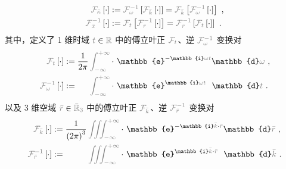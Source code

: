 \begin{subequations} \label{eq:FT-xkappa}
\begin{align}
	\mathcolor{gray}{\mathcal F_{\bar{\kappa}}} \left[ \cdot \right] &:= \mathcolor{gray}{\mathcal F_{\omega}^{-1}} \left[ \mathcolor{gray}{\mathcal F_{\bar{k}}} \left[ \cdot \right] \right] = \mathcolor{gray}{\mathcal F_{\bar{k}}} \left[ \mathcolor{gray}{\mathcal F_{\omega}^{-1}} \left[ \cdot \right] \right] ~, \label{eq:FT-kappa} \\
	\mathcolor{gray}{\mathcal F_{\bar{x}}^{-1}} \left[ \cdot \right] &:= \mathcolor{gray}{\mathcal F_{t}} \left[ \mathcolor{gray}{\mathcal F_{\bar{r}}^{-1}} \left[ \cdot \right] \right] = \mathcolor{gray}{\mathcal F_{\bar{r}}^{-1}} \left[ \mathcolor{gray}{\mathcal F_{t}} \left[ \cdot \right] \right] ~. \label{eq:IFT-x}
\end{align}
\end{subequations}
其中，定义了 1 维时域 $\mathcolor{gray}{t} \in \mathcolor{gray}{\mathbb{R}}$ 中的傅立叶正 $\mathcolor{gray}{\mathcal F_{t}}$、逆 $\mathcolor{gray}{\mathcal F_{\omega}^{-1}}$ 变换对
\begin{subequations} \label{eq:FT-tw}
\begin{align}
	\mathcolor{gray}{\mathcal F_{t}} \left[ \cdot \right] &:= \frac{ 1 }{ 2\pi } \mathcolor{gray}{\int_{-\infty}^{+\infty}} \cdot~ \mathbb{e}^{-\mathbb{i}\mathcolor{gray}{\omega} \mathcolor{gray}{t}} \mathbb{d}\mathcolor{gray}{\omega} ~, \label{eq:FT-t} \\
	\mathcolor{gray}{\mathcal F_{\omega}^{-1}} \left[ \cdot \right] &:= \hphantom{\frac{ 1 }{ 2\pi }} \mathcolor{gray}{\int_{-\infty}^{+\infty}} \cdot~ \mathbb{e}^{\mathbb{i}\mathcolor{gray}{\omega} \mathcolor{gray}{t}} \hphantom{^-} \mathbb{d}\mathcolor{gray}{t} ~. \label{eq:IFT-w}
\end{align}
\end{subequations}
以及 3 维空域 $\mathcolor{gray}{\bar{r}} \in \mathcolor{gray}{\bar{\mathbb{R}}_{3}}$ 中的傅立叶正 $\mathcolor{gray}{\mathcal F_{\bar{k}}}$、逆 $\mathcolor{gray}{\mathcal F_{\bar{r}}^{-1}}$ 变换对
\begin{subequations} \label{eq:FT-rk}
\begin{align}
	\mathcolor{gray}{\mathcal F_{\bar{k}}} \left[ \cdot \right] &:= \frac{ 1 }{ \left( 2\pi \right)^3 } \mathcolor{gray}{\iiint_{-\infty}^{+\infty}} \cdot~ \mathbb{e}^{-\mathbb{i}\mathcolor{gray}{\bar{k}} \cdot \mathcolor{gray}{\bar{r}}} \mathbb{d}\mathcolor{gray}{\bar{r}} ~, \label{eq:FT-k} \\
	\mathcolor{gray}{\mathcal F_{\bar{r}}^{-1}} \left[ \cdot \right] &:= \hphantom{\frac{ 1 }{ \left( 2\pi \right)^3 }} \mathcolor{gray}{\iiint_{-\infty}^{+\infty}} \cdot~ \mathbb{e}^{\mathbb{i}\mathcolor{gray}{\bar{k}} \cdot \mathcolor{gray}{\bar{r}}} \hphantom{^-} \mathbb{d}\mathcolor{gray}{\bar{k}} ~. \label{eq:IFT-r}
\end{align}
\end{subequations}
